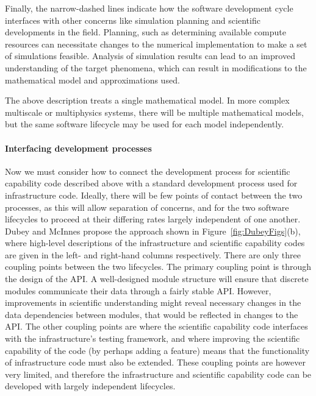 Finally, the narrow-dashed lines indicate how the software development cycle interfaces
with other concerns like simulation planning and scientific developments in the
field.
Planning, such as determining available compute resources can necessitate
changes to the numerical implementation to make a set of simulations feasible.
Analysis of simulation results can lead to an improved understanding of the
target phenomena, which can result in modifications to the mathematical model
and approximations used.

The above description treats a single mathematical model.
In more complex multiscale or multiphysics systems, there will be multiple
mathematical models, but the same software lifecycle may be used for each model
independently.

\paragraph{Interfacing development processes}
Now we must consider how to connect the development process for scientific capability code
described above with a standard development process used for infrastructure code.
Ideally, there will be few points of contact between the two processes, as this
will allow separation of concerns, and for the two software lifecycles to
proceed at their differing rates largely independent of one another.
Dubey and McInnes \cite{Du16Idea} propose the approach shown in Figure\
\ref{fig:DubeyFigs}(b), where high-level descriptions of the infrastructure and
scientific capability codes are given in the left- and right-hand columns
respectively.
There are only three coupling points between the two lifecycles.
The primary coupling point is through the design of the API.
A well-designed module structure will ensure that discrete modules
communicate their data through a fairly stable API.
However, improvements in scientific understanding might reveal necessary
changes in the data dependencies between modules, that would be reflected in
changes to the API.
The other coupling points are where the scientific capability code interfaces
with the infrastructure's testing framework,
and where improving the scientific capability of the code (by perhaps adding
a feature) means that the functionality of infrastructure code must also be
extended.
These coupling points are however very limited, and therefore the
infrastructure and scientific capability code can be developed with largely
independent lifecycles.

